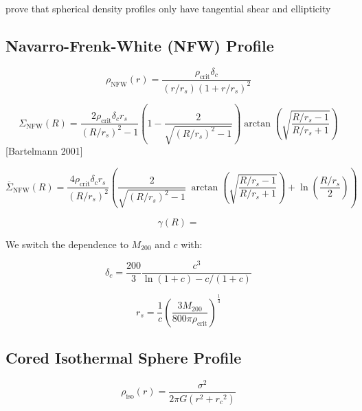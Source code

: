 \documentclass[]{article}
\begin{document}
prove that spherical density profiles only have tangential shear and ellipticity

\newpage

\subsection{Navarro-Frenk-White (NFW) Profile}

\begin{equation}
    \rho_\mathrm{NFW}(r) = \frac{\rho_\mathrm{crit} \delta_c}{(r/r_s)\left(1 + r/r_s\right)^2}
\end{equation}

\begin{equation}
    \Sigma_\mathrm{NFW}(R) = \frac{2 \rho_\mathrm{crit} \delta_c r_s}{(R/r_s)^2 - 1} \left(1 - \frac{2}{\sqrt{(R/r_s)^2 - 1}} \right) \arctan\left(\sqrt{\frac{R/r_s - 1}{R/r_s + 1}} \right)
\end{equation}
[Bartelmann 2001]

\begin{equation}
    \overline{\Sigma}_\mathrm{NFW}(R) = \frac{4 \rho_\mathrm{crit} \delta_c r_s}{(R/r_s)^2} \left(
        \frac{2}{\sqrt{(R/r_s)^2 - 1}} ~\arctan\left(\sqrt{\frac{R/r_s - 1}{R/r_s + 1}} \right) + \ln{\left(\frac{R/r_s}{2}\right)}
    \right)
\end{equation}

\begin{equation}
    \gamma(R) =
\end{equation}

We switch the dependence to $M_{200}$ and $c$ with:

\begin{equation}
    \delta_c = \frac{200}{3} \frac{c^3}{\ln(1 + c) - c/(1 + c)}
\end{equation}

\begin{equation}
    r_s = \frac{1}{c} \left(\frac{3M_{200}}{800\pi \rho_\mathrm{crit}}\right)^\frac{1}{3}
\end{equation}

\subsection{Cored Isothermal Sphere Profile}

\begin{equation}
    \rho_\mathrm{iso}(r) = \frac{\sigma^2}{2\pi G (r^2 + {r_c}^2)}
\end{equation}
\end{document}
